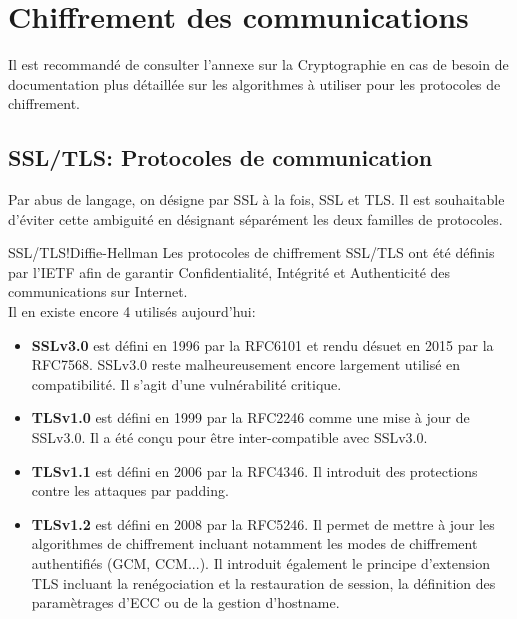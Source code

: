 \documentclass[twoside,a4paper,12pt,titlepage]{book}
\begin{document}

\section{Chiffrement des communications}
\begin{Warning}
Il est recommandé de consulter l'annexe sur la Cryptographie en cas de besoin de documentation plus détaillée sur les algorithmes à utiliser pour les protocoles de chiffrement.
\end{Warning}
\subsection{SSL/TLS: Protocoles de communication}
\begin{Stop}
Par abus de langage, on désigne par SSL à la fois, \gls{SSL} et \gls{TLS}. Il est souhaitable d'éviter cette ambiguité en désignant séparément les deux familles de protocoles.
\end{Stop}
\begin{Define}{SSL/TLS!Diffie-Hellman}
Les protocoles de chiffrement SSL/TLS ont été définis par l'\gls{IETF} afin de garantir Confidentialité, Intégrité et Authenticité des communications sur Internet.\\
Il en existe encore 4 utilisés aujourd'hui:\begin{itemize}
\item \textbf{\gls{SSL}v3.0} est défini en 1996 par la \gls{RFC}6101 et rendu désuet en 2015 par la \gls{RFC}7568. SSLv3.0 reste malheureusement encore largement utilisé en compatibilité. Il s'agit d'une vulnérabilité critique.
\item \textbf{\gls{TLS}v1.0} est défini en 1999 par la \gls{RFC}2246 comme une mise à jour de SSLv3.0. Il a été conçu pour être inter-compatible avec SSLv3.0.
\item \textbf{\gls{TLS}v1.1} est défini en 2006 par la \gls{RFC}4346. Il introduit des protections contre les attaques par padding.
\item \textbf{\gls{TLS}v1.2} est défini en 2008 par la \gls{RFC}5246. Il permet de mettre à jour les algorithmes de chiffrement incluant notamment les modes de chiffrement authentifiés (\gls{GCM}, \gls{CCM}...). Il introduit également le principe d'extension TLS incluant la renégociation et la restauration de session, la définition des paramètrages d'\gls{ECC} ou de la gestion d'hostname.
\end{itemize}
\end{Define}
\end{document}
